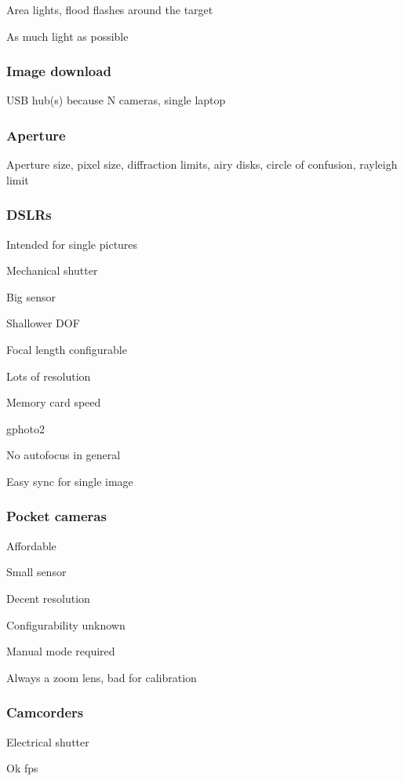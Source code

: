 Area lights, flood flashes around the target

As much light as possible

\subsubsection{Image download}

USB hub(s) because N cameras, single laptop


\subsubsection{Aperture}

Aperture size, pixel size, diffraction limits, airy disks, circle of confusion, rayleigh limit

\subsubsection{DSLRs}

Intended for single pictures

Mechanical shutter

Big sensor

Shallower DOF

Focal length configurable

Lots of resolution

Memory card speed

gphoto2

No autofocus in general

Easy sync for single image

\subsubsection{Pocket cameras}

Affordable

Small sensor

Decent resolution

Configurability unknown

Manual mode required

Always a zoom lens, bad for calibration


\subsubsection{Camcorders}

Electrical shutter

Ok fps

